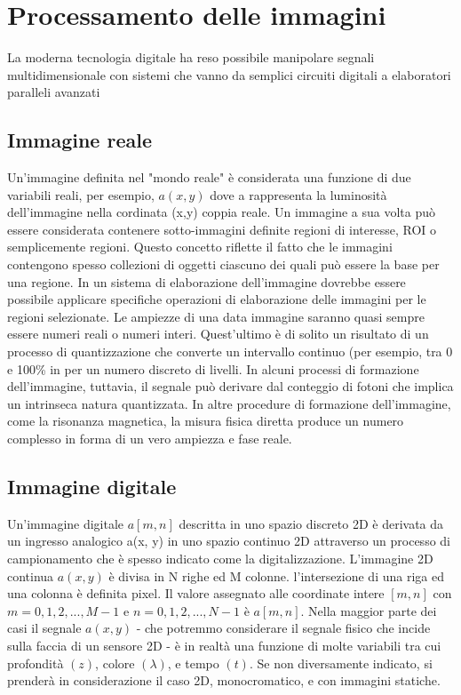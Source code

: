 \section{Processamento delle immagini}

La moderna tecnologia digitale ha reso possibile manipolare 
segnali multidimensionale con sistemi che vanno da semplici circuiti digitali a elaboratori paralleli avanzati

\subsection{Immagine reale} 
Un'immagine definita nel "mondo reale" è considerata una funzione di due variabili reali,
per esempio, $a(x, y)$ dove a rappresenta la luminosità dell'immagine nella cordinata (x,y) 
coppia reale. Un immagine a sua volta può essere considerata contenere sotto-immagini definite
regioni di interesse, ROI o semplicemente regioni.
Questo concetto riflette il fatto che le immagini contengono spesso collezioni di oggetti ciascuno dei quali può essere la base per una
regione.
In un sistema di elaborazione dell'immagine dovrebbe essere possibile applicare
specifiche operazioni di elaborazione delle immagini per le regioni selezionate. 
Le ampiezze di una data immagine saranno quasi sempre essere numeri reali o
numeri interi. Quest'ultimo è di solito un risultato di un processo di quantizzazione che
converte un intervallo continuo (per esempio, tra 0 e 100\% in per un numero discreto di
livelli. In alcuni processi di formazione dell'immagine, tuttavia, il segnale può derivare dal
conteggio di fotoni che implica un intrinseca natura quantizzata.
In altre procedure di formazione dell'immagine, come la risonanza magnetica, la
misura fisica diretta produce un numero complesso in forma di un vero
ampiezza e fase reale.

\subsection{Immagine digitale}

Un'immagine digitale $a[m, n]$ descritta in uno spazio discreto 2D è derivata da un ingresso analogico
a(x, y) in uno spazio continuo 2D attraverso un processo di campionamento che è
spesso indicato come la digitalizzazione.
L'immagine 2D continua $a(x, y)$ è divisa in N righe ed M colonne. l'intersezione di una riga ed una colonna è definita pixel. Il valore assegnato alle coordinate intere $[m, n]$ con ${m = 0,1,2, ..., M-1}$ e ${n = 0,1,2, ..., N-1}$ è
$a[m, n]$. 
Nella maggior parte dei casi il segnale  $a(x, y)$ - che potremmo considerare il segnale fisico
che incide sulla faccia di un sensore 2D - è in realtà una funzione di molte
variabili tra cui profondità $(z)$, colore $(\lambda)$, e tempo $(t)$.
Se non diversamente indicato, si prenderà in considerazione il caso  2D, monocromatico, e con immagini statiche.



